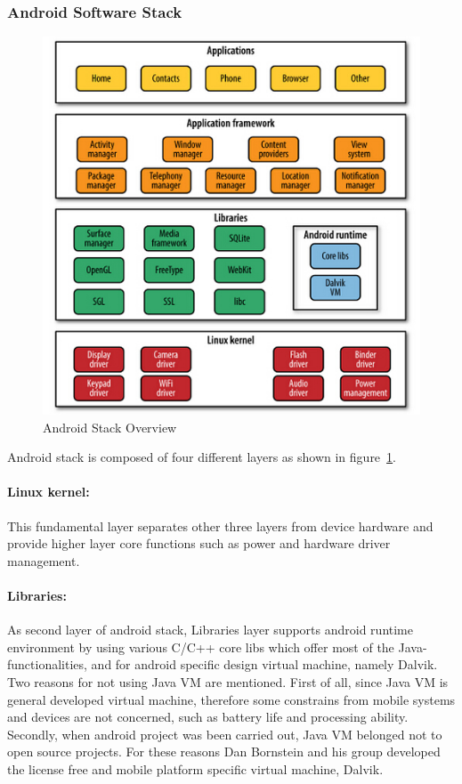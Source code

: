 \documentclass[]{llncs}
\begin{document}
\subsubsection{Android Software Stack}
\begin{figure}[!htbp]
	\centering
	\includegraphics[width=1.0\textwidth]{android-stack.jpg}
		\caption[ ]{Android Stack Overview \cite{learn_android}}
	\label{fig:android-stack}
\end{figure}
Android stack is composed of four different layers as shown in figure~\ref{fig:android-stack}.

\paragraph{Linux kernel:}This fundamental layer separates other three layers  from  device hardware and provide higher layer core  functions such as  power and hardware driver management.
\paragraph{Libraries:}As second layer of android stack,  Libraries layer supports android runtime environment by using various C/C++ core libs which offer most of the Java-functionalities, and for android specific design virtual machine, namely Dalvik\cite{learn_android}. Two reasons for not using Java VM are mentioned\cite{learn_android}. First of all, since Java VM is general developed virtual machine, therefore some constrains from mobile systems and devices are not concerned, such as battery life and processing ability. Secondly, when android project  was been carried out,  Java VM belonged not to open source projects. For these reasons Dan Bornstein and his group developed the license free and mobile platform specific  virtual machine, Dalvik. 
\end{document}

